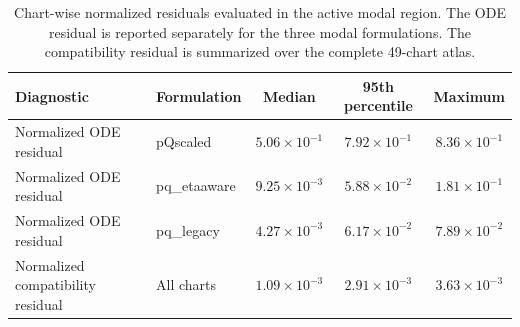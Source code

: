 \begin{table}[!htbp]
\centering
\small
\caption{
Chart-wise normalized residuals evaluated in the active modal region.
The ODE residual is reported separately for the three modal formulations.
The compatibility residual is summarized over the complete 49-chart atlas.
}
\label{tab:supp_chartwise_normalized_residuals}
\begin{tabular}{llccc}
\hline
Diagnostic & Formulation & Median & 95th percentile & Maximum \\
\hline
Normalized ODE residual & pQscaled & $5.06\times10^{-1}$ & $7.92\times10^{-1}$ & $8.36\times10^{-1}$ \\
Normalized ODE residual & pq\_etaaware & $9.25\times10^{-3}$ & $5.88\times10^{-2}$ & $1.81\times10^{-1}$ \\
Normalized ODE residual & pq\_legacy & $4.27\times10^{-3}$ & $6.17\times10^{-2}$ & $7.89\times10^{-2}$ \\
Normalized compatibility residual & All charts & $1.09\times10^{-3}$ & $2.91\times10^{-3}$ & $3.63\times10^{-3}$ \\
\hline
\end{tabular}
\end{table}
